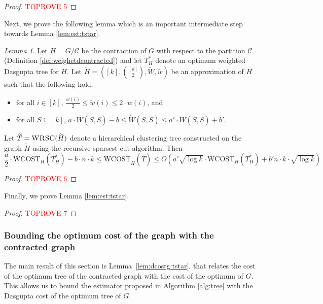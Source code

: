 \documentclass[letterpaper,11pt]{article}
\newcommand{\wCT}{\text{WCOST}}
\newcommand{\cC}{\mathcal{C}}
\theoremstyle{plain}
\theoremstyle{definition}
\theoremstyle{remark}
\newtheorem{lemmma}{Lemma}
\newcommand{\wt}[1]{\widetilde{#1}}
\begin{document}
\begin{proof}\textcolor{red}{TOPROVE 5}\end{proof}



Next, we prove the following lemma which is an important intermediate step towards Lemma \ref{lem:est:tstar}.

\begin{lemmma} \label{lem:general:est:tstar}
 Let $H = G/\cC$ be the contraction of $G$ with respect to the partition $\cC $ (Definition \ref{def:weighetdcontracted}) and  let $T^*_H$ denote an optimum weighted Dasgupta tree for $H$. Let  $\widetilde{H}= \left([k], {[k] \choose 2}, \widetilde{W}, \widetilde{w}\right)$ be an approximation of $H$ such that the following hold:
\begin{itemize}
\item for all $i\in[k]$, $ \frac{w(i)}{2}\leq \wt{w}(i) \leq 2 \cdot w(i)$, and 
\item for all $S \subseteq [k]$, $a \cdot W(S, \overline{S}) - b \leq \wt{W}(S, \overline{S}) \leq a' \cdot W(S, \overline{S}) + b'$.
\end{itemize}

Let $\widetilde{T} = \textsc{WRSC}(\widetilde{H})$ denote a hierarchical clustering tree constructed on the graph $\widetilde{H}$ using the recursive sparsest cut algorithm. Then
\[
		\frac{a}{2}\cdot \wCT_{H}(T^*_{H}) - b\cdot n \cdot k   \leq \wCT_{\wt{H}}(\widetilde{T}) \leq O\left(a' \sqrt{\log k} \cdot \wCT_{H}(T^*_{H}) + b' n \cdot k \cdot \sqrt{\log k}\right)
	\]
\end{lemmma}


\begin{proof}\textcolor{red}{TOPROVE 6}\end{proof}


Finally, we prove Lemma \ref{lem:est:tstar}.
\lemesttilde*

\begin{proof}\textcolor{red}{TOPROVE 7}\end{proof}


\subsubsection{Bounding the optimum cost of the graph with the contracted graph} \label{sec:opt:contracted:cost}

The main result of this section is Lemma~\ref{lem:dcostg:tstar}, that relates the cost of the optimum tree of the contracted graph with the cost of the optimum of $G$. This allows us to bound the estimator proposed in Algorithm \ref{alg:tree} with the Dasgupta cost of the optimum tree of $G$.
\end{document}

